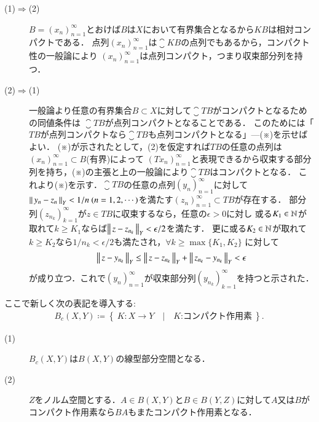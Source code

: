 	\begin{prf}\mbox{}
		\begin{description}
			\item[(1)$\Rightarrow$(2)]
				$B = (x_n)_{n=1}^{\infty}$とおけば$B$は$X$において有界集合となるから$KB$は相対コンパクトである．
				点列$(x_n)_{n=1}^{\infty}$は$\closure{KB}$の点列でもあるから，コンパクト性の一般論により
				$(x_n)_{n=1}^{\infty}$は点列コンパクト，つまり収束部分列を持つ．
			\item[(2)$\Rightarrow$(1)]
				一般論より任意の有界集合$B \subset X$に対して$\closure{TB}$がコンパクトとなるための同値条件は
				$\closure{TB}$が点列コンパクトとなることである．
				このためには「$TB$が点列コンパクトなら$\closure{TB}$も点列コンパクトとなる」---(※)を示せばよい．
				(※)が示されたとして，(2)を仮定すれば$TB$の任意の点列は$(x_n)_{n=1}^{\infty} \subset B$(有界)によって
				$(Tx_n)_{n=1}^{\infty}$と表現できるから収束する部分列を持ち，(※)の主張と上の一般論により$\closure{TB}$はコンパクトとなる．
				これより(※)を示す．$\closure{TB}$の任意の点列$(y_n)_{n=1}^{\infty}$に対して
				$\Norm{y_n - z_n}{Y} < 1/n\ (n=1,2,\cdots)$を満たす$(z_n)_{n=1}^{\infty} \subset TB$が存在する．
				部分列$(z_{n_k})_{k=1}^{\infty}$が$z \in TB$に収束するなら，任意の$\epsilon > 0$に対し
				或る$K_1 \in \mathbb{N}$が取れて$k \geq K_1$ならば$\left\|\, z - z_{n_k}\, \right\|_{Y} < \epsilon/2$を満たす．
				更に或る$K_2 \in \mathbb{N}$が取れて$k \geq K_2$なら$1/n_k < \epsilon/2$も満たされ，$\forall k \geq \max{}{\{K_1,K_2\}}$
				に対して
				\begin{align}
					\left\|\, z - y_{n_k}\, \right\|_{Y} \leq \left\|\, z - z_{n_k}\, \right\|_{Y} + \left\|\, z_{n_k} - y_{n_k}\, \right\|_{Y} < \epsilon
				\end{align}
				が成り立つ．これで$(y_n)_{n=1}^{\infty}$が収束部分列$(y_{n_k})_{k=1}^{\infty}$を持つと示された．
		\end{description}
		\QED
	\end{prf}
	
	\begin{itembox}[l]{}
		\begin{dfn}[コンパクト作用素の空間]
			ここで新しく次の表記を導入する:
			\begin{align}
				B_c(X,Y) \coloneqq \left\{\ K:X \rightarrow Y\quad |\quad \mbox{$K$:コンパクト作用素}\ \right\}.
			\end{align}
		\end{dfn}
	\end{itembox}
	
	\begin{itembox}[l]{}
		\begin{prp}\mbox{}
			\begin{description}
				\item[(1)] $B_c(X,Y)$は$B(X,Y)$の線型部分空間となる．
				\item[(2)] $Z$をノルム空間とする．$A \in B(X,Y)$と$B \in B(Y,Z)$に対して$A$又は$B$がコンパクト作用素なら$BA$もまたコンパクト作用素となる．
			\end{description}
		\end{prp}
	\end{itembox}
	

